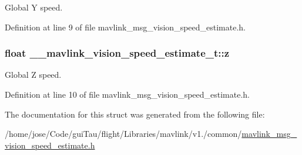 Global Y speed. 



Definition at line 9 of file mavlink\-\_\-msg\-\_\-vision\-\_\-speed\-\_\-estimate.\-h.

\hypertarget{struct____mavlink__vision__speed__estimate__t_a019d0fa1a28f8c96b0092c9c47ced03d}{
\subsubsection[{z}]{\setlength{\rightskip}{0pt plus 5cm}float \-\_\-\-\_\-mavlink\-\_\-vision\-\_\-speed\-\_\-estimate\-\_\-t\-::z}}\label{struct____mavlink__vision__speed__estimate__t_a019d0fa1a28f8c96b0092c9c47ced03d}


Global Z speed. 



Definition at line 10 of file mavlink\-\_\-msg\-\_\-vision\-\_\-speed\-\_\-estimate.\-h.



The documentation for this struct was generated from the following file\-:\begin{DoxyCompactItemize}
\item 
/home/jose/\-Code/gui\-Tau/flight/\-Libraries/mavlink/v1./common/\hyperlink{mavlink__msg__vision__speed__estimate_8h}{mavlink\-\_\-msg\-\_\-vision\-\_\-speed\-\_\-estimate.\-h}\end{DoxyCompactItemize}
